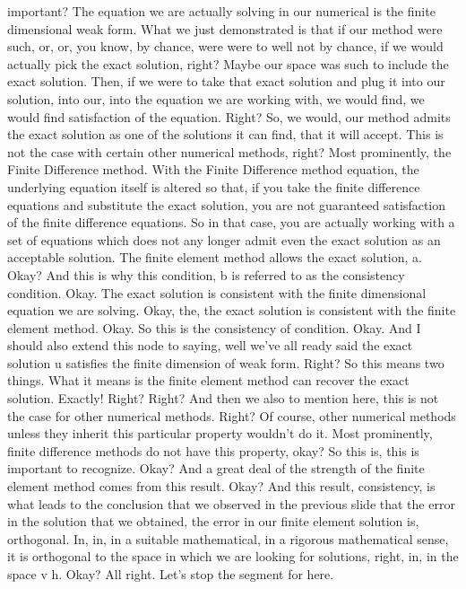 \documentclass[10pt]{article}
\begin{document}
{important? The equation we are actually solving in our numerical is the finite dimensional weak form. What we just demonstrated is that if our method were such, or, or, you know, by chance, were were to well not by chance, if we would actually pick the exact solution, right? Maybe our space was such to include the exact solution. Then, if we were to take that exact solution and plug it into our solution, into our, into the equation we are working with, we would find, we would find satisfaction of the equation. Right? So, we would, our method admits the exact solution as one of the solutions it can find, that it will accept. This is not the case with certain other numerical methods, right? Most prominently, the Finite Difference method. With the Finite Difference method equation, the underlying equation itself is altered so that, if you take the finite difference equations and substitute the exact solution, you are not guaranteed satisfaction of the finite difference equations. So in that case, you are actually working with a set of equations which does not any longer admit even the exact solution as an acceptable solution. The finite element method allows the exact solution, a. Okay? And this is why this condition, b is referred to as the consistency condition. Okay. The exact solution is consistent with the finite dimensional equation we are solving. Okay, the, the exact solution is consistent with the finite element method. Okay. So this is the consistency of condition. Okay. And I should also extend this node to saying, well we've all ready said the exact solution u satisfies the finite dimension of weak form. Right? So this means two things. What it means is the finite element method can recover the exact solution. Exactly! Right? Right? And then we also to mention here, this is not the case for other numerical methods. Right? Of course, other numerical methods unless they inherit this particular property wouldn't do it. Most prominently, finite difference methods do not have this property, okay? So this is, this is important to recognize. Okay? And a great deal of the strength of the finite element method comes from this result. Okay? And this result, consistency, is what leads to the conclusion that we observed in the previous slide that the error in the solution that we obtained, the error in our finite element solution is, orthogonal. In, in, in a suitable mathematical, in a rigorous mathematical sense, it is orthogonal to the space in which we are looking for solutions, right, in, in the space v h. Okay? All right. Let's stop the segment for here.

}
\end{document}
